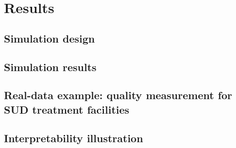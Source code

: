 \documentclass[12pt]{article}
\begin{document}
\section{Results}
\label{sec:results}

\subsection{Simulation design}

\subsection{Simulation results}

\subsection{Real-data example: quality measurement for SUD treatment facilities}

\subsection{Interpretability illustration}
\end{document}
